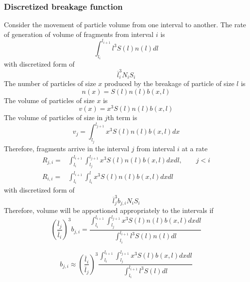\documentclass[12pt]{article}
\begin{document}
\subsubsection{Discretized breakage function}
Consider the movement of particle volume from one interval to another. The rate of generation of volume of fragments from interval $i$ is
\begin{equation}
\int_{l_i}^{l_{i+1}}l^3S(l)n(l)dl
\end{equation}
with discretized form of
\begin{equation}
\overline{l}_i^3N_iS_i
\end{equation}
The number of particles of size $x$ produced by the breakage of particle of size $l$ is
\begin{equation*}
n(x) = S(l)n(l)b(x,l)
\end{equation*}
The volume of particles of size $x$ is
\begin{equation*}
v(x)=x^3S(l)n(l)b(x,l)
\end{equation*}
The volume of particles of size in $j$th term is
\begin{equation*}
v_j=\int_{l_j}^{l_{j+1}}x^3S(l)n(l)b(x,l)dx
\end{equation*}
Therefore, fragments arrive in the interval $j$ from interval $i$ at a rate
\begin{equation}
\begin{aligned}
R_{j,i}=&\int_{l_i}^{l_{i+1}}\int_{l_j}^{l_{j+1}}x^3S(l)n(l)b(x,l)dxdl,\qquad j<i\\
R_{i,i}=&\int_{l_i}^{l_{i+1}}\int_{l_i}^lx^3S(l)n(l)b(x,l)dxdl
\end{aligned}
\end{equation}
with discretized form of
\begin{equation}
\overline{l}_j^3b_{j,i}N_iS_i
\end{equation}
Therefore, volume will be apportioned appropriately to the intervals if
\begin{equation*}
\left(\frac{\overline{l}_j}{\overline{l}_i}\right)^3b_{j,i}=\frac{\int_{l_i}^{l_{i+1}}\int_{l_j}^{l_{j+1}}x^3S(l)n(l)b(x,l)dxdl}{\int_{l_i}^{l_{i+1}}l^3S(l)n(l)dl}
\end{equation*}


\begin{equation}
b_{j,i}\approx\left(\frac{\overline{l}_i}{\overline{l}_j}\right)^3\frac{\int_{l_i}^{l_{i+1}}\int_{l_j}^{l_{j+1}}x^3S(l)b(x,l)dxdl}{\int_{l_i}^{l_{i+1}}l^3S(l)dl}
\end{equation}
\end{document}
